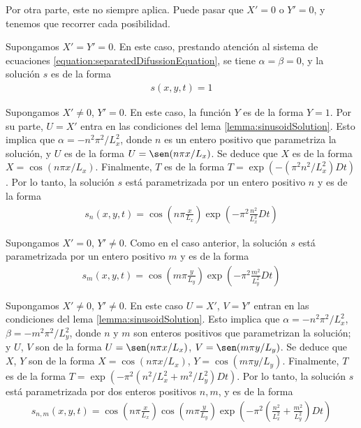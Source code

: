\documentclass{article}
\begin{document}
  Por otra parte, este no siempre aplica.
  Puede pasar que \(X' = 0\) o \(Y' = 0\), y tenemos que recorrer cada posibilidad.

  Supongamos \(X' = Y' = 0\).
  En este caso, prestando atención al sistema de ecuaciones \eqref{equation:separatedDifussionEquation}, se tiene \(\alpha = \beta = 0\), y la solución \(s\) es de la forma 
  \begin{align}
    \label{equation:bareSolution}
    s(x, y, t) = 1
  \end{align}

  Supongamos \(X' \neq 0\), \(Y' = 0\).
  En este caso, la función \(Y\) es de la forma \(Y = 1\).
  Por su parte, \(U = X'\) entra en las condiciones del lema \ref{lemma:sinusoidSolution}.
  Esto implica que \(\alpha = - n^2 \pi^2 / L_x^2\), donde \(n\) es un entero positivo que parametriza la solución, y \(U\) es de la forma \(U = \sen(n \pi x / L_x)\).
  Se deduce que \(X\) es de la forma \(X = \cos(n \pi x / L_x)\).
  Finalmente, \(T\) es de la forma \(T = \exp(- (\pi^2 n^2 / L_x^2) D t)\).
  Por lo tanto, la solución \(s\) está parametrizada por un entero positivo \(n\) y es de la forma
  \begin{align}
    \label{equation:alphaSolutions}
    s_n(x, y, t)
    =
    \cos\left( n \pi \frac{x}{L_x} \right) \exp\left( - \pi^2 \frac{n^2}{L_x^2} D t \right)
  \end{align}

  Supongamos \(X' = 0\), \(Y' \neq 0\).
  Como en el caso anterior, la solución \(s\) está parametrizada por un entero positivo \(m\) y es de la forma
  \begin{align}
    \label{equation:betaSolutions}
    s_m(x, y, t)
    =
    \cos\left(m \pi \frac{y}{L_y}\right) \exp\left( - \pi^2 \frac{m^2}{L_y^2} D t \right)
  \end{align}

  Supongamos \(X' \neq 0\), \(Y' \neq 0\).
  En este caso \(U = X'\), \(V = Y'\) entran en las condiciones del lema \ref{lemma:sinusoidSolution}.
  Esto implica que \(\alpha = - n^2 \pi^2 / L_x^2\), \(\beta = - m^2 \pi^2 / L_y^2\), donde \(n\) y \(m\) son enteros positivos que parametrizan la solución; y \(U\), \(V\) son de la forma \(U = \sen(n \pi x / L_x)\), \(V = \sen(m \pi y / L_y)\).
  Se deduce que \(X\), \(Y\) son de la forma \(X = \cos(n \pi x / L_x)\), \(Y = \cos(m \pi y / L_y)\).
  Finalmente, \(T\) es de la forma \(T = \exp(- \pi^2 (n^2 / L_x^2 + m^2 / L_y^2) D t)\).
  Por lo tanto, la solución \(s\) está parametrizada por dos enteros positivos \(n, m\), y es de la forma
  \begin{align}
    \label{equation:alphaBetaSolutions}
    s_{n, m}(x, y, t)
    =
    \cos\left( n \pi \frac{x}{L_x} \right)
    \cos\left( m \pi \frac{y}{L_y} \right)
    \exp\left( - \pi^2 \left( \frac{n^2}{L_x^2} + \frac{m^2}{L_y^2} \right) D t \right)
  \end{align}
\end{document}
